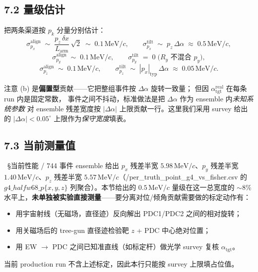 \subsection*{7.2 量级估计}

把两条渠道按 $p_k$ 分量分别估计：
\begin{equation}
  \sigma_{p_x}^\mathrm{align} \;\sim\; \frac{p_z\,\delta x}{L_\mathrm{arm}}\,\sqrt 2
       \;\sim\; 0.1\,\mathrm{MeV}/c,\qquad
  \sigma_{p_x}^\mathrm{tilt}  \;\sim\; p_z\,\Delta\alpha
       \;\approx\; 0.5\,\mathrm{MeV}/c,
  \label{eq:partIIc:tilt:sigma-x}
\end{equation}
\begin{equation}
  \sigma_{p_y}^\mathrm{align} \;\sim\; 0.1\,\mathrm{MeV}/c,\qquad
  \sigma_{p_y}^\mathrm{tilt}  \;=\; 0\;\text{(}R_y \text{ 不混合 } p_y\text{)},
  \label{eq:partIIc:tilt:sigma-y}
\end{equation}
\begin{equation}
  \sigma_{p_z}^\mathrm{align} \;\sim\; 0.1\,\mathrm{MeV}/c,\qquad
  \sigma_{p_z}^\mathrm{tilt}  \;\sim\; |p_x|_\mathrm{typ}\,\Delta\alpha
       \;\approx\; 0.05\,\mathrm{MeV}/c.
  \label{eq:partIIc:tilt:sigma-z}
\end{equation}

注意 (b) 是\textbf{偏置型}贡献——它把整组事件按 $\Delta\alpha$ 旋转一致量；
但因 $\alpha_\mathrm{tgt}^\mathrm{real}$ 在每条 run 内是固定常数，
事件之间不抖动，标准做法是把 $\Delta\alpha$ 作为 ensemble 内\emph{未知系统参数}
对 ensemble 残差宽度按 $|\Delta\alpha|$ 上限贡献一行。这里我们采用 survey
给出的 $|\Delta\alpha| < 0.05^\circ$ 上限作为\emph{保守宽度}填表。

\subsection*{7.3 当前测量值}

\StatusReport{}~§当前性能 / 744 事件 ensemble 给出 $p_x$ 残差半宽 $5.98\,\mathrm{MeV}/c$、$p_y$ 残差半宽 $1.40\,\mathrm{MeV}/c$、$p_z$ 残差半宽 $5.57\,\mathrm{MeV}/c$（\DeepDiveData{}/per\_truth\_point\_g4\_vs\_fisher.csv 的 $g4\_halfw68\_p\{x,y,z\}$ 列聚合）。本节给出的 $0.5\,\mathrm{MeV}/c$ 量级在这一总宽度的 $\sim 8\%$ 水平上，\textbf{未单独被实验直接测量}——要分离对位/倾角贡献需要做的标定动作有：
\begin{itemize}
  \item 用宇宙射线（无磁场，直径迹）反向解出 PDC1/PDC2 之间的相对旋转；
  \item 用关磁场后的 tree-gun 直径迹检验靶 $z$ + PDC 中心绝对位置；
  \item 用 EW $\to$ PDC 之间已知准直线（如标定杆）做光学 survey 复核 $\alpha_\mathrm{tgt}$。
\end{itemize}
当前 production run 不含上述标定，因此本行只能按 survey 上限填占位值。

